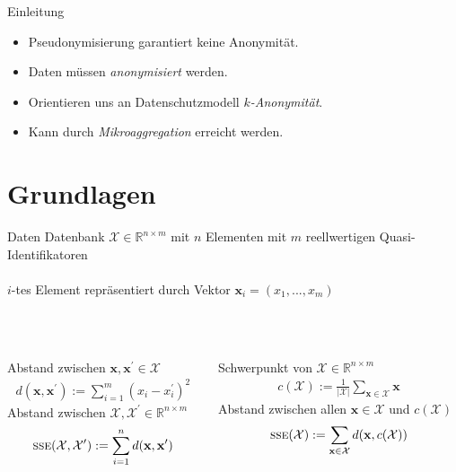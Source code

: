 \documentclass[10pt,table]{beamer}
\newcommand{\sse}{\textsc{sse}\xspace}
\begin{document}
\begin{frame}{Einleitung}
\begin{itemize}
    \item Pseudonymisierung garantiert keine Anonymität.
    \item Daten müssen \emph{anonymisiert} werden.
    \item Orientieren uns an Datenschutzmodell \emph{$k$-Anonymität}.
    \item Kann durch \emph{Mikroaggregation} erreicht werden.
\end{itemize}
\end{frame}

\section{Grundlagen}
\begin{frame}{Daten}
    Datenbank $\mathcal{X}\in\mathbb{R}^{n\times m}$ mit $n$ Elementen mit $m$ reellwertigen Quasi-Identifikatoren
    \\~\\
    $i$-tes Element repräsentiert durch Vektor $\mathbf{x}_i = (x_1,...,x_m)$
    \\~\\~\\
    \begin{columns}
        \begin{column}{0.42\textwidth}
            Abstand zwischen $\mathbf{x},\mathbf{x}^\prime\in\mathcal{X}$
            \begin{align*}
                d(\mathbf{x},\mathbf{x}^\prime) := \sum\limits_{i=1}^m(x_i-x^\prime_i)^2
            \end{align*}
            Abstand zwischen $\mathcal{X},\mathcal{X}^\prime\in\mathbb{R}^{n\times m}$
            \begin{align*}
                 \sse(\mathcal{X},\mathcal{X}^\prime) := \sum\limits_{i=1}^nd(\mathbf{x},\mathbf{x}^\prime)
            \end{align*}
        \end{column}
        \begin{column}{0.5\textwidth}
            Schwerpunkt von $\mathcal{X}\in\mathbb{R}^{n\times m}$
            \begin{align*}
                c(\mathcal{X}) := \frac{1}{|\mathcal{X}|}\sum\limits_{\mathbf{x}\in\mathcal{X}}\mathbf{x}
            \end{align*}
            Abstand zwischen allen $\mathbf{x}\in\mathcal{X}$ und $c(\mathcal{X})$
            \begin{align*}
                \sse(\mathcal{X}) := \sum\limits_{\mathbf{x}\in\mathcal{X}}d(\mathbf{x},c(\mathcal{X}))
            \end{align*}
        \end{column}
    \end{columns}    
\end{frame}
\end{document}
